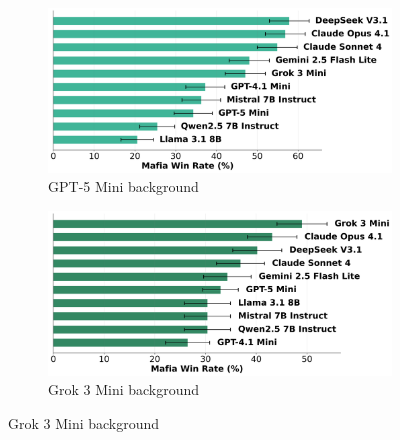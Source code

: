 \documentclass{article}
\begin{document}
\begin{figure}[htbp]
    \centering
    \begin{subfigure}[b]{0.48\textwidth}
        \centering
        \includegraphics[width=\textwidth]{../results/mafioso_gpt-4.1_mini_db_benchmark.png}
        \caption{GPT-5 Mini background}
        \label{fig:mafioso_gpt5mini_appendix}
    \end{subfigure}
    \hfill
    \begin{subfigure}[b]{0.48\textwidth}
        \centering
        \includegraphics[width=\textwidth]{../results/mafioso_gpt-5_mini_db_benchmark.png}
        \caption{Grok 3 Mini background}
        \label{fig:mafioso_grok3_appendix}
    \end{subfigure}
    
    \vspace{0.5cm}
    

\end{figure}
\end{document}
